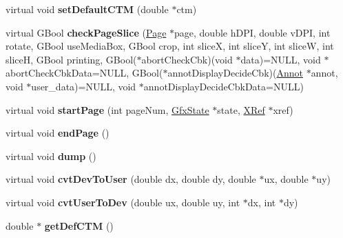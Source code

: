 \begin{DoxyCompactItemize}
\mbox{\label{class_output_dev_a626861f473e4c868a7846f289a7f32dd}} 
virtual void {\bfseries set\+Default\+C\+TM} (double $\ast$ctm)
\item 
\mbox{\label{class_output_dev_a223ee5e8d92f2d66130d1c0e33990fc9}} 
virtual G\+Bool {\bfseries check\+Page\+Slice} (\hyperlink{class_page}{Page} $\ast$page, double h\+D\+PI, double v\+D\+PI, int rotate, G\+Bool use\+Media\+Box, G\+Bool crop, int sliceX, int sliceY, int sliceW, int sliceH, G\+Bool printing, G\+Bool($\ast$abort\+Check\+Cbk)(void $\ast$data)=N\+U\+LL, void $\ast$abort\+Check\+Cbk\+Data=N\+U\+LL, G\+Bool($\ast$annot\+Display\+Decide\+Cbk)(\hyperlink{class_annot}{Annot} $\ast$annot, void $\ast$user\+\_\+data)=N\+U\+LL, void $\ast$annot\+Display\+Decide\+Cbk\+Data=N\+U\+LL)
\item 
\mbox{\label{class_output_dev_a1521b7823ba04bccef3f69f71ddf068a}} 
virtual void {\bfseries start\+Page} (int page\+Num, \hyperlink{class_gfx_state}{Gfx\+State} $\ast$state, \hyperlink{class_x_ref}{X\+Ref} $\ast$xref)
\item 
\mbox{\label{class_output_dev_a6ee379b0784e080f28058fc226f1c590}} 
virtual void {\bfseries end\+Page} ()
\item 
\mbox{\label{class_output_dev_a829cff0b8ff47de516574542de539d1c}} 
virtual void {\bfseries dump} ()
\item 
\mbox{\label{class_output_dev_aeefcb427f9006903796d6d467e393adc}} 
virtual void {\bfseries cvt\+Dev\+To\+User} (double dx, double dy, double $\ast$ux, double $\ast$uy)
\item 
\mbox{\label{class_output_dev_aff3985dadb18d1e458419ebd997c44c1}} 
virtual void {\bfseries cvt\+User\+To\+Dev} (double ux, double uy, int $\ast$dx, int $\ast$dy)
\item 
\mbox{\label{class_output_dev_a1238a44cb9258955a94151a16e671878}} 
double $\ast$ {\bfseries get\+Def\+C\+TM} ()
\item 
\mbox{\label{class_output_dev_a1438903f85bc90716abee8122cf489e8}} 

\end{DoxyCompactItemize}
